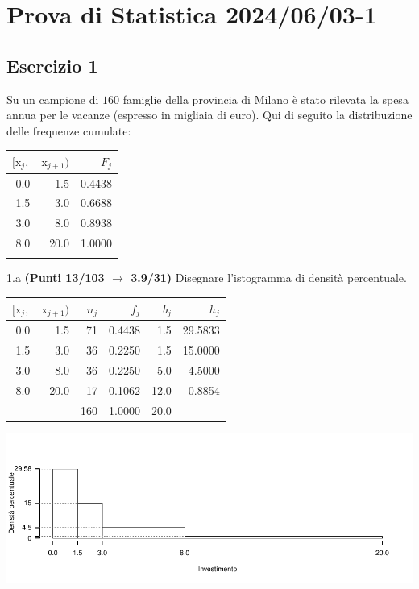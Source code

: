 \documentclass[
  11pt,
]{book}
\theoremstyle{mytheoremstyle}
\theoremstyle{mydefstyle}
\newenvironment{sol}
  {
  \begin{tcolorbox}[enhanced,breakable,arc=0.1mm,boxrule=1pt,colback=white,colframe=iblue,
  title=\bf \fontfamily{lmss}\selectfont \hspace{.5 cm} Soluzione,drop fuzzy shadow]

}{
\end{tcolorbox}
  }
\begin{document}
\section{Prova di Statistica 2024/06/03-1}\label{prova-di-statistica-20240603-1}

\subsection{Esercizio 1}\label{esercizio-1-34}

Su un campione di \(160\) famiglie della provincia di Milano è stato rilevata la spesa annua per le vacanze (espresso in migliaia di euro). Qui di seguito la distribuzione delle frequenze cumulate:

\begin{table}[H]
\centering
\begin{tabular}{rrr}
\toprule
$[\text{x}_j,$ & $\text{x}_{j+1})$ & $F_j$\\
\midrule
0.0 & 1.5 & 0.4438\\
1.5 & 3.0 & 0.6688\\
3.0 & 8.0 & 0.8938\\
8.0 & 20.0 & 1.0000\\
 &  & \\
\bottomrule
\end{tabular}
\end{table}

1.a \textbf{(Punti 13/103 \(\rightarrow\) 3.9/31)} Disegnare l'istogramma di densità percentuale.

\begin{sol}

\begin{table}[H]
\centering
\begin{tabular}{rrrrrr}
\toprule
$[\text{x}_j,$ & $\text{x}_{j+1})$ & $n_j$ & $f_j$ & $b_j$ & $h_j$\\
\midrule
0.0 & 1.5 & 71 & 0.4438 & 1.5 & 29.5833\\
1.5 & 3.0 & 36 & 0.2250 & 1.5 & 15.0000\\
3.0 & 8.0 & 36 & 0.2250 & 5.0 & 4.5000\\
8.0 & 20.0 & 17 & 0.1062 & 12.0 & 0.8854\\
 &  & 160 & 1.0000 & 20.0 & \\
\bottomrule
\end{tabular}
\end{table}

\begin{center}\includegraphics{Esami_passati_con_soluzioni_files/figure-latex/2024-43-1} \end{center}

\end{sol}
\end{document}
